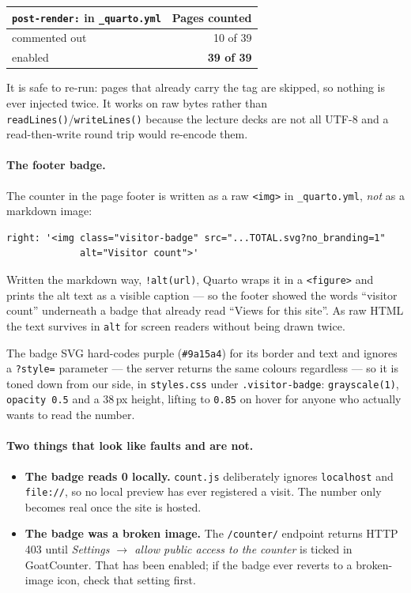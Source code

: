 \documentclass[11pt,a4paper]{article}
\newcommand{\file}[1]{\texttt{#1}}
\begin{document}
\begin{center}
\begin{tabular}{@{}lr@{}}
\toprule
\textbf{\texttt{post-render:} in \file{\_quarto.yml}} & \textbf{Pages counted} \\
\midrule
commented out & 10 of 39 \\
enabled       & \textbf{39 of 39} \\
\bottomrule
\end{tabular}
\end{center}

It is safe to re-run: pages that already carry the tag are skipped, so
nothing is ever injected twice. It works on raw bytes rather than
\texttt{readLines()}/\texttt{writeLines()} because the lecture decks are not
all UTF-8 and a read-then-write round trip would re-encode them.

\paragraph{The footer badge.} The counter in the page footer is written as a
raw \texttt{<img>} in \file{\_quarto.yml}, \emph{not} as a markdown image:
\begin{lstlisting}
right: '<img class="visitor-badge" src="...TOTAL.svg?no_branding=1"
             alt="Visitor count">'
\end{lstlisting}
Written the markdown way, \texttt{!\lbrack alt\rbrack(url)}, Quarto wraps it in
a \texttt{<figure>} and prints the alt text as a visible caption --- so the
footer showed the words ``visitor count'' underneath a badge that already
read ``Views for this site''. As raw HTML the text survives in \texttt{alt}
for screen readers without being drawn twice.

The badge SVG hard-codes purple (\texttt{\#9a15a4}) for its border and text
and ignores a \texttt{?style=} parameter --- the server returns the same
colours regardless --- so it is toned down from our side, in
\file{styles.css} under \texttt{.visitor-badge}: \texttt{grayscale(1)},
\texttt{opacity 0.5} and a 38\,px height, lifting to \texttt{0.85} on hover
for anyone who actually wants to read the number.

\paragraph{Two things that look like faults and are not.}
\begin{itemize}[itemsep=2pt]
\item \textbf{The badge reads 0 locally.} \file{count.js} deliberately
  ignores \texttt{localhost} and \texttt{file://}, so no local preview has
  ever registered a visit. The number only becomes real once the site is
  hosted.
\item \textbf{The badge was a broken image.} The \texttt{/counter/} endpoint
  returns HTTP 403 until \emph{Settings $\to$ allow public access to the
  counter} is ticked in GoatCounter. That has been enabled; if the badge ever
  reverts to a broken-image icon, check that setting first.
\end{itemize}
\end{document}
